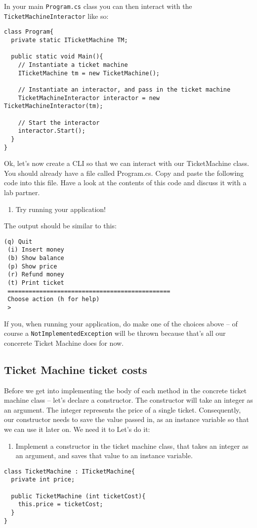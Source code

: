 \documentclass{article}
\newcounter{stepcounter}
\newenvironment{steps}{ 
  \begin{enumerate}[label=\color{red}Step \theenumi)]
    \setcounter{enumi}{\value{stepcounter}}
}{
  \setcounter{stepcounter}{\value{enumi}}
  \end{enumerate}
}
\begin{document}
In your main \texttt{Program.cs} class you can then interact with the \texttt{TicketMachineInteractor} like so:

\begin{lstlisting}
class Program{
  private static ITicketMachine TM;
  
  public static void Main(){
    // Instantiate a ticket machine
    ITicketMachine tm = new TicketMachine();

    // Instantiate an interactor, and pass in the ticket machine
    TicketMachineInteractor interactor = new TicketMachineInteractor(tm);

    // Start the interactor
    interactor.Start();
  }
}
\end{lstlisting}

Ok, let’s now create a CLI so that we can interact with our TicketMachine class. You should already have a file called Program.cs. Copy and paste the following code into this file. Have a look at the contents of this code and discuss it with a lab partner.

\begin{steps}
\item Try running your application!
\end{steps}
The output should be similar to this:

\begin{lstlisting}[style=terminal]
 (q) Quit
 (i) Insert money
 (b) Show balance
 (p) Show price
 (r) Refund money
 (t) Print ticket
 ==============================================
 Choose action (h for help)
 >
\end{lstlisting}
If you, when running your application, do make one of the choices above -- of course a \texttt{NotImplementedException} will be thrown because that's all our concerete Ticket Machine does for now.




\subsection{Ticket Machine ticket costs}
Before we get into implementing the body of each method in the concrete ticket machine class -- let's declare a constructor. The constructor will take an integer as an argument. The integer represents the price of a single ticket. Consequently, our constructor needs to save the value passed in, as an instance variable so that we can use it later on. We need it to  Let's do it:
\begin{steps}
\item Implement a constructor in the ticket machine class, that takes an integer as an argument, and saves that value to an instance variable.
\end{steps}
\begin{lstlisting}
class TicketMachine : ITicketMachine{
  private int price;

  public TicketMachine (int ticketCost){
    this.price = ticketCost;
  }
}
\end{lstlisting}
\end{document}
